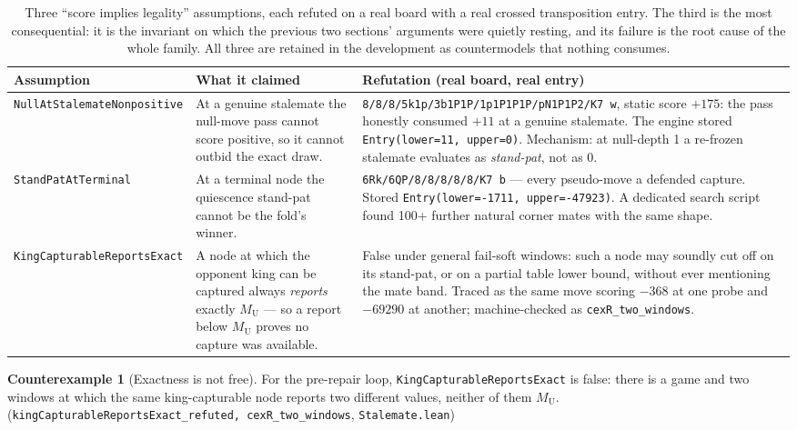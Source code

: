 \documentclass[11pt]{article}
\newcommand{\MU}{M_{\mathrm{U}}}    %
\newcommand{\leanref}[2]{(\texttt{#1}, \texttt{#2})}%
\theoremstyle{plain}
\theoremstyle{definition}
\newtheorem{counterexample}[theorem]{Counterexample}
\theoremstyle{remark}
\begin{document}
\begin{table}[t]
\centering
\footnotesize
\begin{tabular}{@{}p{3.4cm}p{4.6cm}p{5.6cm}@{}}
\toprule
\textbf{Assumption} & \textbf{What it claimed} & \textbf{Refutation (real board, real entry)}\\
\midrule
\texttt{NullAtStalemate\-Nonpositive} &
At a genuine stalemate the null-move pass cannot score positive, so it
cannot outbid the exact draw. &
\texttt{8/8/8/5k1p/3b1P1P/1p1P1P1P/pN1P1P2/K7 w}, static score $+175$:
the pass honestly consumed $+11$ at a genuine stalemate.  The engine
stored \texttt{Entry(lower=11, upper=0)}.  Mechanism: at null-depth 1 a
re-frozen stalemate evaluates as \emph{stand-pat}, not as $0$.\\
\addlinespace
\texttt{StandPatAtTerminal} &
At a terminal node the quiescence stand-pat cannot be the fold's
winner. &
\texttt{6Rk/6QP/8/8/8/8/8/K7 b} --- every pseudo-move a defended
capture.  Stored \texttt{Entry(lower=-1711, upper=-47923)}.  A
dedicated search script found 100+ further natural corner mates with
the same shape.\\
\addlinespace
\texttt{KingCapturable\-ReportsExact} &
A node at which the opponent king can be captured always \emph{reports}
exactly $\MU$ --- so a report below $\MU$ proves no capture was
available. &
False under general fail-soft windows: such a node may soundly cut off
on its stand-pat, or on a partial table lower bound, without ever
mentioning the mate band.  Traced as the same move scoring $-368$ at
one probe and $-69290$ at another; machine-checked as
\texttt{cexR\_two\_windows}.\\
\bottomrule
\end{tabular}
\caption{Three ``score implies legality'' assumptions, each refuted on
a real board with a real crossed transposition entry.  The third is the
most consequential: it is the invariant on which the previous two
sections' arguments were quietly resting, and its failure is the root
cause of the whole family.  All three are retained in the development
as countermodels that nothing consumes.}
\label{tab:refuted}
\end{table}

\begin{counterexample}[Exactness is not free]
\label{cex:kcr}
For the pre-repair loop, \texttt{KingCapturableReportsExact} is false:
there is a game and two windows at which the same king-capturable node
reports two different values, neither of them $\MU$.
\leanref{kingCapturableReportsExact\_refuted, cexR\_two\_windows}{Stalemate.lean}
\end{counterexample}
\end{document}
